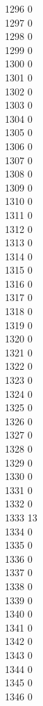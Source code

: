 { 1296	0 \\
 1297	0 \\
 1298	0 \\
 1299	0 \\
 1300	0 \\
 1301	0 \\
 1302	0 \\
 1303	0 \\
 1304	0 \\
 1305	0 \\
 1306	0 \\
 1307	0 \\
 1308	0 \\
 1309	0 \\
 1310	0 \\
 1311	0 \\
 1312	0 \\
 1313	0 \\
 1314	0 \\
 1315	0 \\
 1316	0 \\
 1317	0 \\
 1318	0 \\
 1319	0 \\
 1320	0 \\
 1321	0 \\
 1322	0 \\
 1323	0 \\
 1324	0 \\
 1325	0 \\
 1326	0 \\
 1327	0 \\
 1328	0 \\
 1329	0 \\
 1330	0 \\
 1331	0 \\
 1332	0 \\
 1333	13 \\
 1334	0 \\
 1335	0 \\
 1336	0 \\
 1337	0 \\
 1338	0 \\
 1339	0 \\
 1340	0 \\
 1341	0 \\
 1342	0 \\
 1343	0 \\
 1344	0 \\
 1345	0 \\
 1346	0 \\
}
